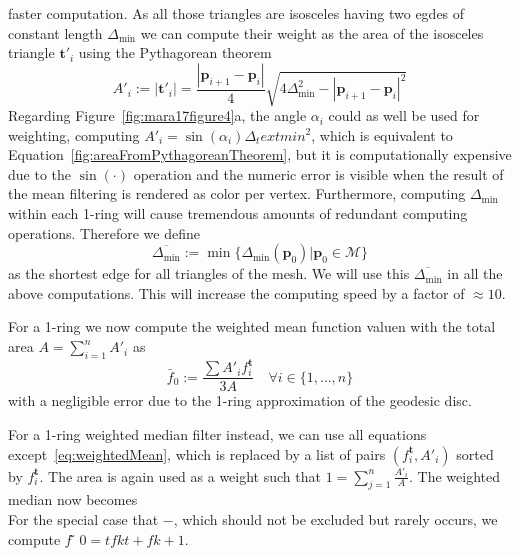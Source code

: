 \documentclass[openany]{book}
\begin{document}
faster computation. As all those triangles are isosceles having two egdes of 
constant length $\Delta_\text{min}$ we can compute their weight as the area of the 
isosceles triangle $\mathbf{t}'_i$ using the Pythagorean theorem
\begin{equation}
	A'_i := |\mathbf{t}'_i| = \frac{|\mathbf{p}_{i+1} - \mathbf{p}_i|}{4}
	\sqrt{4\Delta_\text{min}^2 - |\mathbf{p}_{i+1} - \mathbf{p}_i|^2}
	\label{eq:areaFromPythagoreanTheorem}
\end{equation}
Regarding Figure~\ref{fig:mara17figure4}a, the angle $\alpha_i$ could as well be 
used for weighting, computing $A'_i = \sin(\alpha_i)\Delta_text{min}^2$, which is 
equivalent to Equation~\ref{fig:areaFromPythagoreanTheorem}, but it 
is computationally expensive due to the $\sin(\cdot)$ operation and the numeric error 
is visible when the result of the mean filtering is rendered as color per 
vertex. Furthermore, computing $\Delta_\text{min}$ within each 1-ring will cause 
tremendous amounts of redundant computing operations. Therefore we define 
\begin{equation}
	\overline{\Delta_\text{min}} := \min\{\Delta_\text{min}(\mathbf{p}_0) | 
	\mathbf{p}_0 \in \mathcal{M}\}
\end{equation} 
as the shortest edge for all triangles of the mesh. We will use this 
$\overline{\Delta_\text{min}}$ in all the above computations. This will increase the 
computing speed by a factor of $\approx 10$. 

For a 1-ring we now compute the weighted mean function valuen with the total area
$A = \displaystyle\sum_{i=1}^nA'_i$ as
\begin{equation}
	\bar{f}_0 := \frac{\sum A'_if_i^\mathbf{t}}{3A} \quad \forall i \in \{1,\ldots,n\}
	\label{eq:weightedMean}
\end{equation}
with a negligible error due to the 1-ring approximation of the geodesic 
disc.

For a 1-ring weighted median filter instead, we can use all equations 
except~\ref{eq:weightedMean}, which is replaced by a list of pairs $(f_i^\mathbf{t}, 
A'_i)$ sorted by $f_i^\mathbf{t}$. The area is again used as a weight such that 
$1 = \displaystyle\sum_{j=1}^n\frac{A'_i}{A}$. The weighted median now becomes
\begin{equation}
\end{equation}
For the special case that $-$, which should not be excluded but rarely occurs, 
we compute $f  ̃ 0 =tf k t + f k+1$.~\cite[s.~3.2]{Mara17}
\end{document}
